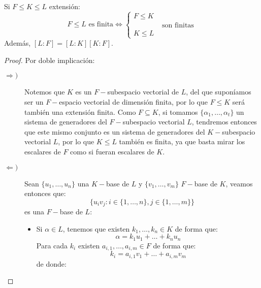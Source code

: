 \begin{lema}[de la Torre]
    Si $F\leq K \leq L$ extensión:
    \begin{equation*}
        F\leq L \text{\ es finita} \Longleftrightarrow \left\{\begin{array}{l}
            F\leq K \\
            \qquad \qquad \text{son finitas} \\
            K \leq L 
        \end{array}\right.
    \end{equation*}
    Además, $[L:F] = [L:K][K:F]$.
    \begin{proof}
        Por doble implicación:
        \begin{description}
            \item [$\Longrightarrow )$] Notemos que $K$ es un $F-$subespacio vectorial de $L$, del que suponíamos ser un $F-$espacio vectorial de dimensión finita, por lo que $F\leq K$ será también una extensión finita. Como $F\subseteq K$, si tomamos $\{\alpha_1, \ldots, \alpha_t\}$ un sistema de generadores del $F-$subespacio vectorial $L$, tendremos entonces que este mismo conjunto es un sistema de generadores del $K-$subespacio vectorial $L$, por lo que $K\leq L$ también es finita, ya que basta mirar los escalares de $F$ como si fueran escalares de $K$.
            \item [$\Longleftarrow )$] Sean $\{u_1, \ldots, u_n\}$ una $K-$base de $L$ y $\{v_1, \ldots, v_m\}$ $F-$base de $K$, veamos entonces que:
                \begin{equation*}
                    \{u_i v_j : i \in \{1,\ldots,n\}, j\in \{1,\ldots,m\}\}
                \end{equation*}
                es una $F-$base de $L$:
                \begin{itemize}
                    \item Si $\alpha\in L$, tenemos que existen $k_1, \ldots, k_n\in K$ de forma que:
                        \begin{equation*}
                            \alpha = k_1u_1 + \ldots + k_nu_n
                        \end{equation*}
                        Para cada $k_i$ existen $a_{i,1}, \ldots, a_{i,m}\in F$ de forma que:
                        \begin{equation*}
                            k_i = a_{i,1}v_1 + \ldots + a_{i,m}v_m
                        \end{equation*}
                        de donde:

\end{itemize}
\end{description}
\end{proof}
\end{lema}
